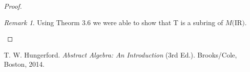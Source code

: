 \documentclass{article}
\theoremstyle{definition}
\theoremstyle{remark}
\newtheorem{remark}[thm]{Remark}
\numberwithin{equation}{section}
\begin{document}
\begin{proof}
\begin{remark} \textbf{}
Using Theorm 3.6 we were able to show that T is a subring of $M(${\rm I\!R}$)$.
\end{remark}
\end{proof}

\begin{thebibliography}{10}

 T. W. Hungerford. \emph{Abstract Algebra: An Introduction} (3rd Ed.). Brooks/Cole, Boston, 2014.

\end{thebibliography}
\end{document}
